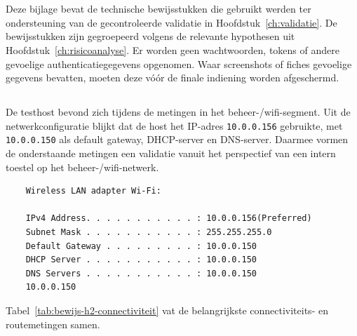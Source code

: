 
\chapter{}%
\label{app:bewijsstukken}

Deze bijlage bevat de technische bewijsstukken die gebruikt werden ter ondersteuning van de gecontroleerde validatie in Hoofdstuk~\ref{ch:validatie}. De bewijsstukken zijn gegroepeerd volgens de relevante hypothesen uit Hoofdstuk~\ref{ch:risicoanalyse}. Er worden geen wachtwoorden, tokens of andere gevoelige authenticatiegegevens opgenomen. Waar screenshots of fiches gevoelige gegevens bevatten, moeten deze vóór de finale indiening worden afgeschermd.

\section{}%
\label{app:h2-netwerksegmentatie}

De testhost bevond zich tijdens de metingen in het beheer-/wifi-segment. Uit de netwerkconfiguratie blijkt dat de host het IP-adres \texttt{10.0.0.156} gebruikte, met \texttt{10.0.0.150} als default gateway, DHCP-server en DNS-server. Daarmee vormen de onderstaande metingen een validatie vanuit het perspectief van een intern toestel op het beheer-/wifi-netwerk.

\begin{verbatim}
    Wireless LAN adapter Wi-Fi:
    
    IPv4 Address. . . . . . . . . . . : 10.0.0.156(Preferred)
    Subnet Mask . . . . . . . . . . . : 255.255.255.0
    Default Gateway . . . . . . . . . : 10.0.0.150
    DHCP Server . . . . . . . . . . . : 10.0.0.150
    DNS Servers . . . . . . . . . . . : 10.0.0.150
    10.0.0.150
\end{verbatim}

Tabel~\ref{tab:bewijs-h2-connectiviteit} vat de belangrijkste connectiviteits- en routemetingen samen.

